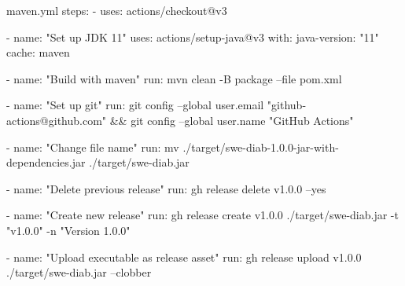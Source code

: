 \begin{yamlCode}{maven.yml}
steps:
  - uses: actions/checkout@v3

  - name: "Set up JDK 11"
    uses: actions/setup-java@v3
    with:
      java-version: "11"
      cache: maven

  - name: "Build with maven"
    run: mvn clean -B package --file pom.xml

  - name: "Set up git"
    run: git config --global user.email "github-actions@github.com" && git config --global user.name "GitHub Actions"

  - name: "Change file name"
    run: mv ./target/swe-diab-1.0.0-jar-with-dependencies.jar ./target/swe-diab.jar

  - name: "Delete previous release"
    run: gh release delete v1.0.0 --yes

  - name: "Create new release"
    run: gh release create v1.0.0 ./target/swe-diab.jar -t "v1.0.0" -n "Version 1.0.0"

  - name: "Upload executable as release asset"
    run: gh release upload v1.0.0 ./target/swe-diab.jar --clobber
\end{yamlCode}
